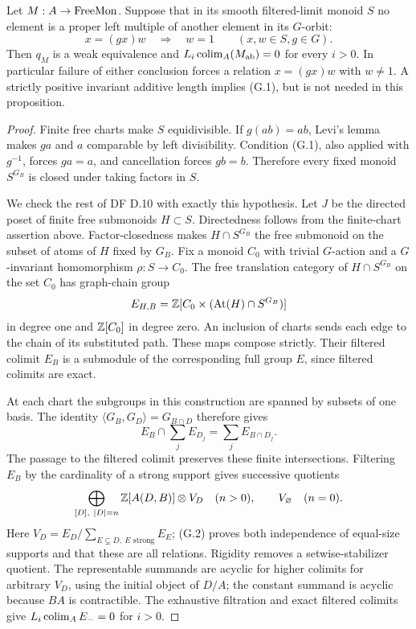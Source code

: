 \begin{proposition}
\label{G:divisibility}
Let $M:A\to\mathrm{FreeMon}$.  Suppose that in its smooth filtered-limit
monoid $S$ no element is a proper left multiple of another element
in its $G$-orbit:
\[
 x=(g x)w\quad\Longrightarrow\quad w=1
 \qquad(x,w\in S, g\in G).
 \tag{G.1}
\]
Then $q_M$ is a weak equivalence and
$L_i\operatorname*{colim}_A(M_{\mathrm{ab}})=0$ for every $i>0$.
In particular failure of either conclusion forces a relation
$x=(g x)w$ with $w\ne1$.  A strictly positive invariant additive
length implies (G.1), but is not needed in this proposition.
\end{proposition}
\begin{proof}
Finite free charts make $S$ equidivisible.  If $g(ab)=ab$, Levi's
lemma makes $ga$ and $a$ comparable by left divisibility.  Condition
(G.1), also applied with $g^{-1}$, forces $ga=a$, and cancellation
forces $gb=b$.  Therefore every fixed monoid $S^{G_B}$ is closed
under taking factors in $S$.

We check the rest of DF D.10 with exactly this hypothesis.  Let $J$
be the directed poset of finite free submonoids $H\subset S$.
Directedness follows from the finite-chart assertion above.
Factor-closedness makes $H\cap S^{G_B}$ the free submonoid on
the subset of atoms of $H$ fixed by $G_B$.
Fix a monoid $C_0$ with trivial $G$-action and a $G$-invariant
homomorphism $\rho:S\to C_0$.  The free translation category
of $H\cap S^{G_B}$ on the set $C_0$ has graph-chain group
\[
 E_{H,B}=\mathbb Z[C_0\times(\operatorname{At}(H)\cap S^{G_B})]
\]
in degree one and $\mathbb Z[C_0]$ in degree zero.  An inclusion of charts
sends each edge to the chain of its substituted path.  These maps
compose strictly.  Their filtered colimit $E_B$ is a submodule of
the corresponding full group $E$, since filtered colimits are exact.

At each chart the subgroups in this construction are spanned by
subsets of one basis.  The identity
$\langle G_B,G_D\rangle=G_{B\cap D}$ therefore gives
\[
 E_B\cap\sum_jE_{D_j}=\sum_jE_{B\cap D_j}.
 \tag{G.2}
\]
The passage to the filtered colimit preserves these finite
intersections.  Filtering $E_B$ by the cardinality of a strong
support gives successive quotients
\[
 \bigoplus_{[D],\ |D|=n}\mathbb Z[A(D,B)]\otimes V_D
 \quad(n>0),
 \qquad V_\varnothing\quad(n=0).
\]
Here $V_D=E_D/\sum_{E\subsetneq D,\ E\text{ strong}}E_E$;
(G.2) proves both independence of equal-size supports and that
these are all relations.  Rigidity removes a setwise-stabilizer
quotient.  The representable summands are acyclic for higher
colimits for arbitrary $V_D$, using the initial object of $D/A$;
the constant summand is acyclic because $BA$ is contractible.
The exhaustive filtration and exact filtered colimits give
$L_i\operatorname*{colim}_A E_-=0$ for $i>0$.


\end{proof}
